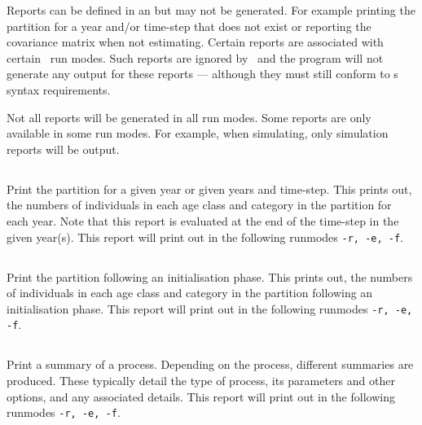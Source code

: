 Reports can be defined in an  but may not be generated. For example printing the partition for a year and/or time-step that does not exist or reporting the covariance matrix when not estimating. Certain reports are associated with certain \CNAME\ run modes. Such reports are ignored by \CNAME\ and the program will not generate any output for these reports --- although they must still conform to \CNAME s syntax requirements.

Not all reports will be generated in all run modes. Some reports are only available in some run modes. For example, when simulating, only simulation reports will be output.

\subsection{}

Print the partition for a given year or given years and time-step. This prints out, the numbers of individuals in each age class and category in the partition for each year. Note that this report is evaluated at the end of the time-step in the given year(s). This report will print out in the following runmodes \texttt{-r, -e, -f}.

\subsection{}

Print the partition following an initialisation phase. This prints out, the numbers of individuals in each age class and category in the partition following an initialisation phase. This report will print out in the following runmodes \texttt{-r, -e, -f}.

\subsection{}
Print a summary of a process. Depending on the process, different summaries are produced. These typically detail the type of process, its parameters and other options, and any associated details. This report will print out in the following runmodes \texttt{-r, -e, -f}.

\subsection{}

